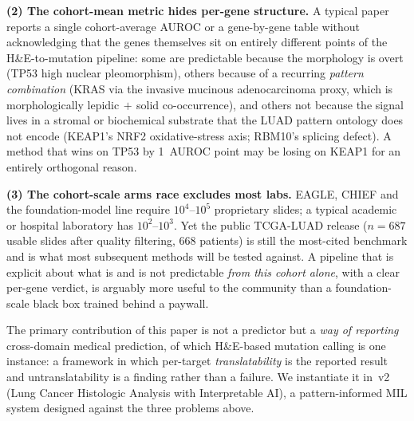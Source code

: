 \textbf{(2) The cohort-mean metric hides per-gene structure.}
A typical paper reports a single cohort-average AUROC or a
gene-by-gene table without acknowledging that the genes themselves
sit on entirely different points of the H\&E-to-mutation pipeline:
some are predictable because the morphology is overt (TP53 high
nuclear pleomorphism), others because of a recurring \emph{pattern
combination} (KRAS via the invasive mucinous adenocarcinoma proxy,
which is morphologically lepidic$\,+\,$solid co-occurrence),
and others not because the signal lives in a stromal or biochemical
substrate that the LUAD pattern ontology does not encode (KEAP1's
NRF2 oxidative-stress axis; RBM10's splicing
defect).\cite{shim2015krasmucinous,rekhtman2013krassolid,cha2017imapatterns,li2011keap1papillary,bechara2013rbm10}
A method that wins on TP53 by 1~AUROC point may be losing on KEAP1
for an entirely orthogonal reason.

\textbf{(3) The cohort-scale arms race excludes most labs.}
EAGLE, CHIEF and the foundation-model line require
$10^4$--$10^5$ proprietary slides; a typical academic or hospital
laboratory has $10^2$--$10^3$.
Yet the public TCGA-LUAD release ($n=687$ usable slides after
quality filtering, $668$ patients) is still the most-cited
benchmark and is what most subsequent methods will be tested
against.\cite{tcga2014luad}
A pipeline that is explicit about what is and is not predictable
\emph{from this cohort alone}, with a clear per-gene verdict, is
arguably more useful to the community than a foundation-scale
black box trained behind a paywall.

The primary contribution of this paper is not a predictor but a
\emph{way of reporting} cross-domain medical prediction, of which
H\&E-based mutation calling is one instance: a framework in which
per-target \emph{translatability} is the reported result and
untranslatability is a finding rather than a failure.
We instantiate it in \lchai{}\,v2 (Lung Cancer Histologic Analysis
with Interpretable AI), a pattern-informed MIL system designed
against the three problems above.

